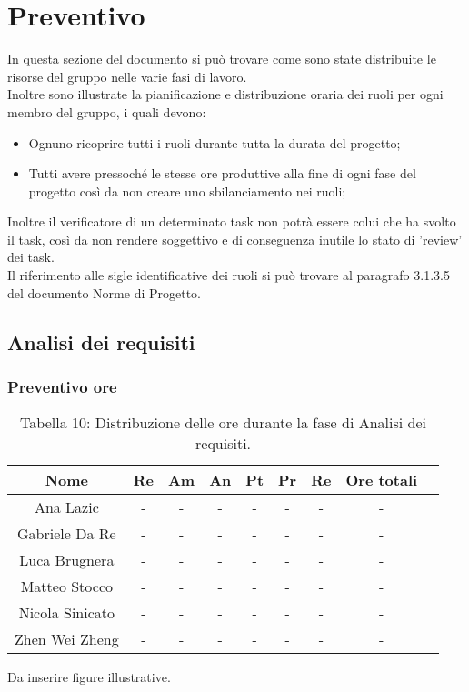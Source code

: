 \section{Preventivo}
In questa sezione del documento si può trovare come sono state distribuite le risorse del gruppo nelle varie fasi di lavoro.\\
Inoltre sono illustrate la pianificazione e distribuzione oraria dei ruoli per ogni membro del gruppo, i quali devono:
\begin{itemize}
	\item Ognuno ricoprire tutti i ruoli durante tutta la durata del progetto;
	\item Tutti avere pressoché le stesse ore produttive alla fine di ogni fase del progetto così da non creare uno sbilanciamento nei ruoli;
\end{itemize}
Inoltre il verificatore di un determinato task non potrà essere colui che ha svolto il task, così da non rendere soggettivo e di conseguenza inutile lo stato di 'review' dei task.\\
Il riferimento alle sigle identificative dei ruoli si può trovare al paragrafo 3.1.3.5 del documento Norme di Progetto.

\subsection{Analisi dei requisiti}
\subsubsection{Preventivo ore}
\begin{table}[h]
	\setlength\extrarowheight{5pt}
	\centering
	\begin{tabularx}{\textwidth}{|c|c|c|c|c|c|c|c|c|}
		\hline
		\textbf{Nome} & \textbf{Re} & \textbf{Am} & \textbf{An} & \textbf{Pt} & \textbf{Pr}& \textbf{Re} & \textbf{Ore totali}\\
		\hline
		Ana Lazic &-&-&-&-&-&-&- \\
		\hline
		Gabriele Da Re &-&-&-&-&-&-&- \\
		\hline
		Luca Brugnera &-&-&-&-&-&-&- \\
		\hline
		Matteo Stocco &-&-&-&-&-&-&- \\
		\hline
		Nicola Sinicato &-&-&-&-&-&-&- \\
		\hline
		Zhen Wei Zheng &-&-&-&-&-&-&- \\
		\hline
	\end{tabularx}
	\vspace{10pt}
	\caption{Tabella 10: Distribuzione delle ore durante la fase di Analisi dei requisiti.}
\end{table}
Da inserire figure illustrative.

